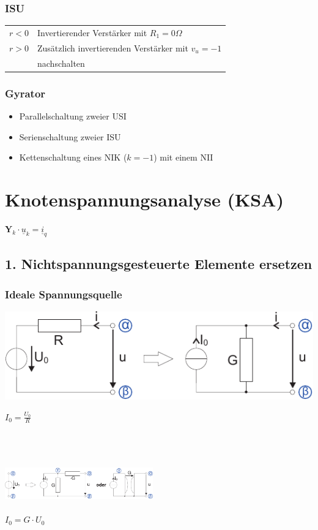 \documentclass[a4paper,twocolumn,10pt]{article}
\begin{document}
\subsubsection*{ISU}
\begin{tabular}{ll}
$r<0$ & Invertierender Verstärker mit $R_1=0\Omega$\\
$r>0$ & Zusätzlich invertierenden Verstärker mit $v_u=-1$\\
& nachschalten
\end{tabular}

\subsubsection*{Gyrator}
\begin{itemize}[label=- ,leftmargin=5mm]
	\item Parallelschaltung zweier USI
	\item Serienschaltung zweier ISU
	\item Kettenschaltung eines NIK ($k=-1$) mit einem NII
\end{itemize}

\section*{Knotenspannungsanalyse (KSA)}
$\textbf{Y}_k\cdot \underline{u}_k=\underline{i}_q$

\subsection*{1. Nichtspannungsgesteuerte Elemente ersetzen}
\subsubsection*{Ideale Spannungsquelle}
\begin{minipage}[b]{0.35\textwidth}
\includegraphics[width=\textwidth]{Grafiken/KSA_Quellwandlung}
\end{minipage}
\hfill
\begin{minipage}[b]{0.1\textwidth}
$I_0=\frac{U_0}{R}$\\\\
\end{minipage}\\\\
\includegraphics[width=0.48\textwidth]{Grafiken/KSA_Quellwandlung2}\\\\
$I_0=G\cdot U_0$
\end{document}
